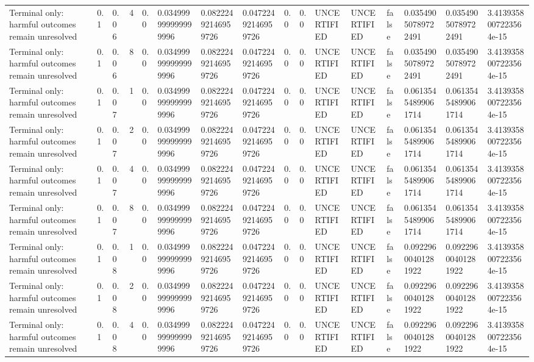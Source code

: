\begin{tabular}{llllllllllllllll}
Terminal only: harmful outcomes remain unresolved & 0.1 & 0.06 & 4 & 0.0 & 0.034999999999999996 & 0.08222492146959726 & 0.04722492146959726 & 0.0 & 0.0 & UNCERTIFIED & UNCERTIFIED & false & 0.03549050789722491 & 0.03549050789722491 & 3.4139358007223564e-15 \\
Terminal only: harmful outcomes remain unresolved & 0.1 & 0.06 & 8 & 0.0 & 0.034999999999999996 & 0.08222492146959726 & 0.04722492146959726 & 0.0 & 0.0 & UNCERTIFIED & UNCERTIFIED & false & 0.03549050789722491 & 0.03549050789722491 & 3.4139358007223564e-15 \\
Terminal only: harmful outcomes remain unresolved & 0.1 & 0.07 & 1 & 0.0 & 0.034999999999999996 & 0.08222492146959726 & 0.04722492146959726 & 0.0 & 0.0 & UNCERTIFIED & UNCERTIFIED & false & 0.06135454899061714 & 0.06135454899061714 & 3.4139358007223564e-15 \\
Terminal only: harmful outcomes remain unresolved & 0.1 & 0.07 & 2 & 0.0 & 0.034999999999999996 & 0.08222492146959726 & 0.04722492146959726 & 0.0 & 0.0 & UNCERTIFIED & UNCERTIFIED & false & 0.06135454899061714 & 0.06135454899061714 & 3.4139358007223564e-15 \\
Terminal only: harmful outcomes remain unresolved & 0.1 & 0.07 & 4 & 0.0 & 0.034999999999999996 & 0.08222492146959726 & 0.04722492146959726 & 0.0 & 0.0 & UNCERTIFIED & UNCERTIFIED & false & 0.06135454899061714 & 0.06135454899061714 & 3.4139358007223564e-15 \\
Terminal only: harmful outcomes remain unresolved & 0.1 & 0.07 & 8 & 0.0 & 0.034999999999999996 & 0.08222492146959726 & 0.04722492146959726 & 0.0 & 0.0 & UNCERTIFIED & UNCERTIFIED & false & 0.06135454899061714 & 0.06135454899061714 & 3.4139358007223564e-15 \\
Terminal only: harmful outcomes remain unresolved & 0.1 & 0.08 & 1 & 0.0 & 0.034999999999999996 & 0.08222492146959726 & 0.04722492146959726 & 0.0 & 0.0 & UNCERTIFIED & UNCERTIFIED & false & 0.09229600401281922 & 0.09229600401281922 & 3.4139358007223564e-15 \\
Terminal only: harmful outcomes remain unresolved & 0.1 & 0.08 & 2 & 0.0 & 0.034999999999999996 & 0.08222492146959726 & 0.04722492146959726 & 0.0 & 0.0 & UNCERTIFIED & UNCERTIFIED & false & 0.09229600401281922 & 0.09229600401281922 & 3.4139358007223564e-15 \\
Terminal only: harmful outcomes remain unresolved & 0.1 & 0.08 & 4 & 0.0 & 0.034999999999999996 & 0.08222492146959726 & 0.04722492146959726 & 0.0 & 0.0 & UNCERTIFIED & UNCERTIFIED & false & 0.09229600401281922 & 0.09229600401281922 & 3.4139358007223564e-15 \\

\end{tabular}
